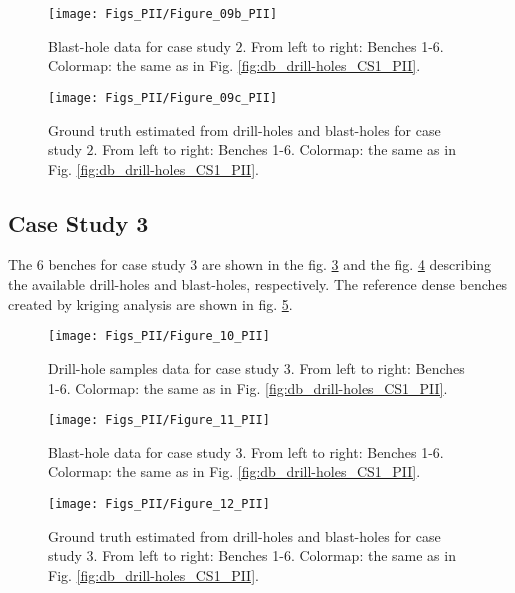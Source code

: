 \begin{figure}[h!]
	\centering
	\texttt{[image: Figs\_PII/Figure\_09b\_PII]}
	\caption{\label{fig:db_blast_CS2_PII} Blast-hole data for case study $2$. From left to right: Benches 1-6. Colormap: the same as in Fig. \ref{fig:db_drill-holes_CS1_PII}.}
\end{figure}	
	
\begin{figure}[h!]
	\centering
	\texttt{[image: Figs\_PII/Figure\_09c\_PII]}
	\caption{\label{fig:db_gt_CS2_PII}Ground truth estimated from drill-holes and blast-holes for case study $2$. From left to right: Benches 1-6. Colormap: the same as in Fig. \ref{fig:db_drill-holes_CS1_PII}.}
\end{figure}

\clearpage
\newpage
\subsection{Case Study 3}
The $6$ benches for case study $3$ are shown in the fig. \ref{fig:db_drill-holes_CS3_PII} and the fig. \ref{fig:db_blast_CS3_PII} describing the available drill-holes and blast-holes, respectively. The reference dense benches created by kriging analysis are shown in fig. \ref{fig:db_gt_CS3_PII}.

\begin{figure}[h!]
	\centering
	\texttt{[image: Figs\_PII/Figure\_10\_PII]}
	\caption{\label{fig:db_drill-holes_CS3_PII} Drill-hole samples data for case study $3$. From left to right: Benches 1-6. Colormap: the same as in Fig. \ref{fig:db_drill-holes_CS1_PII}.}
\end{figure}

\begin{figure}[h!]
	\centering
	\texttt{[image: Figs\_PII/Figure\_11\_PII]}
	\caption{\label{fig:db_blast_CS3_PII} Blast-hole data for case study $3$. From left to right: Benches 1-6. Colormap: the same as in Fig. \ref{fig:db_drill-holes_CS1_PII}.}
\end{figure}

\begin{figure}[h!]
	\centering
	\texttt{[image: Figs\_PII/Figure\_12\_PII]}
	\caption{\label{fig:db_gt_CS3_PII}Ground truth estimated from drill-holes and blast-holes for case study $3$. From left to right: Benches 1-6. Colormap: the same as in Fig. \ref{fig:db_drill-holes_CS1_PII}.}
\end{figure}

